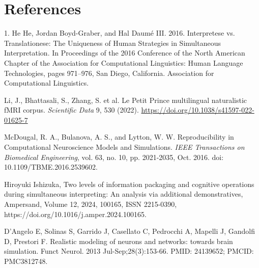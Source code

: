 \section{References}
\begin{thebibliography}{99}

1. He He, Jordan Boyd-Graber, and Hal Daumé III. 2016. Interpretese vs. Translationese: The Uniqueness of Human Strategies in Simultaneous Interpretation. In Proceedings of the 2016 Conference of the North American Chapter of the Association for Computational Linguistics: Human Language Technologies, pages 971–976, San Diego, California. Association for Computational Linguistics.

Li, J., Bhattasali, S., Zhang, S. et al. Le Petit Prince multilingual naturalistic fMRI corpus. \textit{Scientific Data} 9, 530 (2022). \url{https://doi.org/10.1038/s41597-022-01625-7}

McDougal, R. A., Bulanova, A. S., and Lytton, W. W. Reproducibility in Computational Neuroscience Models and Simulations. \textit{IEEE Transactions on Biomedical Engineering}, vol. 63, no. 10, pp. 2021-2035, Oct. 2016. doi: 10.1109/TBME.2016.2539602.

Hiroyuki Ishizuka,
Two levels of information packaging and cognitive operations during simultaneous interpreting: An analysis via additional demonstratives,
Ampersand,
Volume 12,
2024,
100165,
ISSN 2215-0390,
https://doi.org/10.1016/j.amper.2024.100165.

D'Angelo E, Solinas S, Garrido J, Casellato C, Pedrocchi A, Mapelli J, Gandolfi D, Prestori F. Realistic modeling of neurons and networks: towards brain simulation. Funct Neurol. 2013 Jul-Sep;28(3):153-66. PMID: 24139652; PMCID: PMC3812748.



\end{thebibliography}

